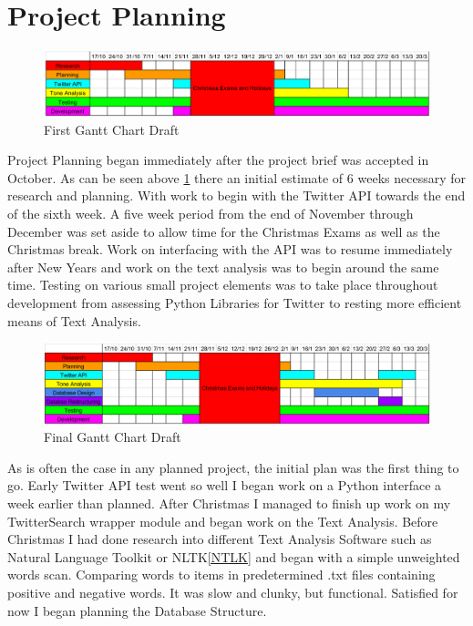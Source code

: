 \documentclass[12pt,a4paper]{report}
\begin{document}
  \section{Project Planning}
  \begin{figure}[h]
  \includegraphics[width=\textwidth]{tt1}
  \caption{First Gantt Chart Draft}
  \label{fig:tt1}
  \end{figure}
  Project Planning began immediately after the project brief was accepted in October. As can be seen above \ref{fig:tt1} there an initial estimate of 6 weeks necessary for research and planning. With work to begin with the Twitter API towards the end of the sixth week. A five week period from the end of November through December was set aside to allow time for the Christmas Exams as well as the Christmas break. Work on interfacing with the API was to resume immediately after New Years and work on the text analysis was to begin around the same time. Testing on various small project elements was to take place throughout development from assessing Python Libraries for Twitter to resting more efficient means of Text Analysis.
  \par
  \begin{figure}[h]
  \includegraphics[width=\textwidth]{tt2}
  \caption{Final Gantt Chart Draft}
  \label{fig:tt2}
  \end{figure}
  As is often the case in any planned project, the initial plan was the first thing to go. Early Twitter API test went so well I began work on a Python interface a week earlier than planned. After Christmas I managed to finish up work on my TwitterSearch\cite{TwitterSearch} wrapper module and began work on the Text Analysis. Before Christmas I had done research into different Text Analysis Software such as Natural Language Toolkit or NLTK\ref{NTLK} and began with a simple unweighted words scan. Comparing words to items in predetermined .txt files containing positive and negative words. It was slow and clunky, but functional. Satisfied for now I began planning the Database Structure.
\end{document}
